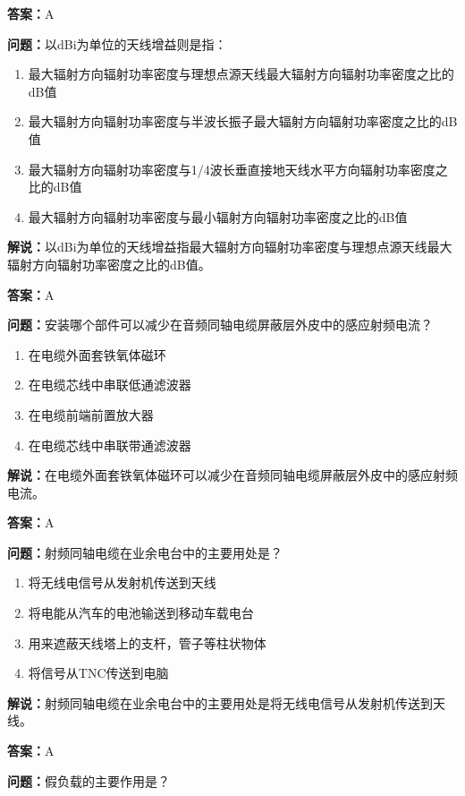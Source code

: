 \documentclass[UTF8]{ctexbook}
\begin{document}
\textbf{答案：}A

\textbf{问题：}以dBi为单位的天线增益则是指：
\begin{enumerate}[label=\Alph*), leftmargin=3em]
  \item 最大辐射方向辐射功率密度与理想点源天线最大辐射方向辐射功率密度之比的dB值
  \item 最大辐射方向辐射功率密度与半波长振子最大辐射方向辐射功率密度之比的dB值
  \item 最大辐射方向辐射功率密度与1/4波长垂直接地天线水平方向辐射功率密度之比的dB值
  \item 最大辐射方向辐射功率密度与最小辐射方向辐射功率密度之比的dB值
\end{enumerate}

\textbf{解说：}以dBi为单位的天线增益指最大辐射方向辐射功率密度与理想点源天线最大辐射方向辐射功率密度之比的dB值。%

\textbf{答案：}A

\textbf{问题：}安装哪个部件可以减少在音频同轴电缆屏蔽层外皮中的感应射频电流？

\begin{enumerate}[label=\Alph*), leftmargin=3em]
  \item 在电缆外面套铁氧体磁环
  \item 在电缆芯线中串联低通滤波器
  \item 在电缆前端前置放大器
  \item 在电缆芯线中串联带通滤波器
\end{enumerate}

\textbf{解说：}在电缆外面套铁氧体磁环可以减少在音频同轴电缆屏蔽层外皮中的感应射频电流。%

\textbf{答案：}A

\textbf{问题：}射频同轴电缆在业余电台中的主要用处是？

\begin{enumerate}[label=\Alph*), leftmargin=3em]
  \item 将无线电信号从发射机传送到天线
  \item 将电能从汽车的电池输送到移动车载电台
  \item 用来遮蔽天线塔上的支杆，管子等柱状物体
  \item 将信号从TNC传送到电脑
\end{enumerate}

\textbf{解说：}射频同轴电缆在业余电台中的主要用处是将无线电信号从发射机传送到天线。%

\textbf{答案：}A

\textbf{问题：}假负载的主要作用是？
\end{document}
